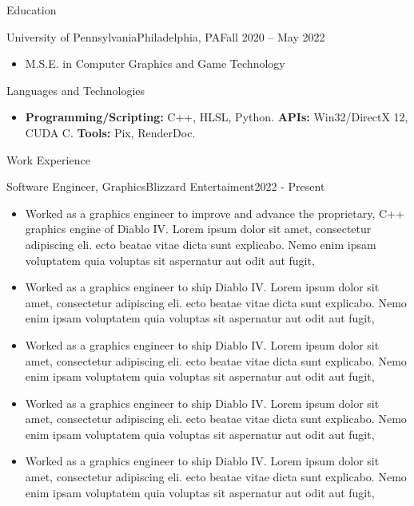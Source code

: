 \documentclass[]{mcdowellcv}
\begin{document}
	\makeheader
	

	\begin{cvsection}{Education}
		\begin{cvsubsection}{University of Pennsylvania}{Philadelphia, PA}{Fall 2020 -- May 2022}
			\begin{itemize}
				\item M.S.E. in Computer Graphics and Game Technology
			\end{itemize}
		\end{cvsubsection}
	\end{cvsection}

	\begin{cvsection}{Languages and Technologies}
		\begin{cvsubsection}{}{}{}	
			\begin{itemize}
				\item \textbf{Programming/Scripting:} C++, HLSL, Python. \textbf{APIs:} Win32/DirectX 12, CUDA C. \textbf{Tools:} Pix, RenderDoc.
			\end{itemize}
		\end{cvsubsection}
	\end{cvsection}

	\begin{cvsection}{Work Experience}
		\begin{cvsubsection}{Software Engineer, Graphics}{Blizzard Entertaiment}{2022 - Present}	
			\begin{itemize}
				\item Worked as a graphics engineer to improve and advance the proprietary, C++ graphics engine of Diablo IV. Lorem ipsum dolor sit amet, consectetur adipiscing eli. ecto beatae vitae dicta sunt explicabo. Nemo enim ipsam voluptatem quia voluptas sit aspernatur aut odit aut fugit, 
				\item Worked as a graphics engineer to ship Diablo IV. Lorem ipsum dolor sit amet, consectetur adipiscing eli. ecto beatae vitae dicta sunt explicabo. Nemo enim ipsam voluptatem quia voluptas sit aspernatur aut odit aut fugit, 
				\item Worked as a graphics engineer to ship Diablo IV. Lorem ipsum dolor sit amet, consectetur adipiscing eli. ecto beatae vitae dicta sunt explicabo. Nemo enim ipsam voluptatem quia voluptas sit aspernatur aut odit aut fugit, 
				\item Worked as a graphics engineer to ship Diablo IV. Lorem ipsum dolor sit amet, consectetur adipiscing eli. ecto beatae vitae dicta sunt explicabo. Nemo enim ipsam voluptatem quia voluptas sit aspernatur aut odit aut fugit, 
				\item Worked as a graphics engineer to ship Diablo IV. Lorem ipsum dolor sit amet, consectetur adipiscing eli. ecto beatae vitae dicta sunt explicabo. Nemo enim ipsam voluptatem quia voluptas sit aspernatur aut odit aut fugit, 
			\end{itemize}
		\end{cvsubsection}
	\end{cvsection}
	
\end{document}

